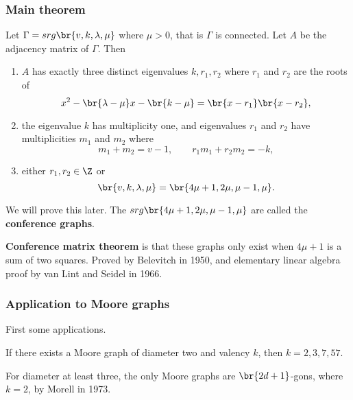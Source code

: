 \subsubsection{Main theorem}

\begin{theorem}
\label{thm:2.7}
Let $ \Gamma = srg\br{v, k, \lambda, \mu} $ where $ \mu > 0 $, that is $ \Gamma $ is connected. Let $ A $ be the adjacency matrix of $ \Gamma $. Then
\begin{enumerate}
\item $ A $ has exactly three distinct eigenvalues $ k, r_1, r_2 $ where $ r_1 $ and $ r_2 $ are the roots of
$$ x^2 - \br{\lambda - \mu}x - \br{k - \mu} = \br{x - r_1}\br{x - r_2}, $$
\item the eigenvalue $ k $ has multiplicity one, and eigenvalues $ r_1 $ and $ r_2 $ have multiplicities $ m_1 $ and $ m_2 $ where
$$ m_1 + m_2 = v - 1, \qquad r_1m_1 + r_2m_2 = -k, $$
\item either $ r_1, r_2 \in \Z $ or
$$ \br{v, k, \lambda, \mu} = \br{4\mu + 1, 2\mu, \mu - 1, \mu}. $$
\end{enumerate}
\end{theorem}

We will prove this later. The $ srg\br{4\mu + 1, 2\mu, \mu - 1, \mu} $ are called the \textbf{conference graphs}.

\begin{note*}
\textbf{Conference matrix theorem} is that these graphs only exist when $ 4\mu + 1 $ is a sum of two squares. Proved by Belevitch in 1950, and elementary linear algebra proof by van Lint and Seidel in 1966.
\end{note*}

\subsubsection{Application to Moore graphs}

First some applications.

\begin{theorem}
If there exists a Moore graph of diameter two and valency $ k $, then $ k = 2, 3, 7, 57 $.
\end{theorem}

\begin{note*}
For diameter at least three, the only Moore graphs are $ \br{2d + 1} $-gons, where $ k = 2 $, by Morell in 1973.
\end{note*}

